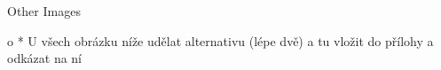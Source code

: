 \app Other Images

		\Green
		\begitems \style o
			* U všech obrázku níže udělat alternativu (lépe dvě) a tu vložit do přílohy a odkázat na ní
		\enditems
		\Black
